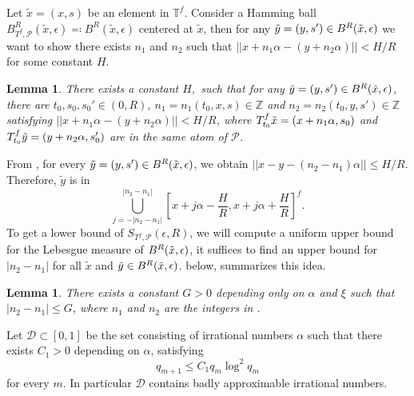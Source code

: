 \documentclass[oneside]{amsart}
\theoremstyle{plain}
\newtheorem{LEM}[THM]{Lemma}
\theoremstyle{definition}
\newcommand{\<}{\langle}
\renewcommand{\>}{\rangle}
\renewcommand{\P}{\mathcal{P}}
\newcommand{\e}{\epsilon}
\renewcommand{\|}{|\!|} %
\begin{document}
 Let $\tilde{x}=(x,s)$ be an element in $\mathbb{T}^f$. Consider a Hamming ball $B_{T^f,\P}^R(\tilde{x},\e)\eqqcolon B^R(\tilde{x},\e)$ centered at $\tilde{x}$, then for any $\tilde{y}=(y,s')\in B^R(\Tilde{x},\e)$ we want to show there exists $n_1$ and $n_2$ such that $\|x+n_1\alpha-(y+n_2\alpha)\|<H/R$ for some constant $H$.

\begin{LEM}
\label{Main lemma}
There exists a constant $H,$ such that for any $\tilde{y}=(y,s')\in B^R(\Tilde{x},\e)$, there are $t_0,s_0,s_0'\in(0,R)$, $n_1=n_1(t_0,x,s)\in \mathbb{Z}$ and $n_2=n_2(t_0,y,s')\in \mathbb{Z}$ satisfying $\|x+n_1\alpha-(y+n_2\alpha)\|<H/R$, where 
$T_{t_0}^f\Tilde{x}=(x+n_1\alpha,s_0)$ and $T_{t_0}^f\Tilde{y}=(y+n_2\alpha,s_0')$ are in the same atom of $\P$.
\end{LEM}

From , for every $\tilde{y}=(y,s')\in B^R(\Tilde{x},\e)$, we obtain $\|x-y-(n_2-n_1)\alpha\|\leq H/R.$ Therefore, $ \tilde{y}$ is in $$\displaystyle\bigcup_{j=-|n_2-n_1|}^{|n_2-n_1|} \left[x+j\alpha-\frac{H}{R},x+j\alpha+\frac{H}{R}\right]^f.$$ 
To get a lower bound of $S_{T^{f},\P}(\e,R)$, we will compute a uniform upper bound for the Lebesgue measure of $B^R(\Tilde{x},\e)$, it suffices to find an upper bound for $|n_2-n_1|$ for all $\tilde{x}$ and $\tilde{y}\in B^R(\Tilde{x},\e)$.
 below, summarizes this idea.

\begin{LEM}
\label{Computation of gap}
There exists a constant $G>0$ depending only on $\alpha$ and $\xi$ such that
$|n_2-n_1|\leq G$, where $n_1$ and $n_2$ are the integers in .
\end{LEM}

Let \(\mathcal{D} \subset [0,1]\) be the set consisting of irrational numbers \(\alpha\) such that there exists \(C_1>0\) depending on $\alpha$, satisfying
\[q_{m+1}\leq C_1q_m \log^2 q_m \] 
for every \(m.\) In particular $\mathcal{D}$ contains badly approximable irrational numbers.
\end{document}
